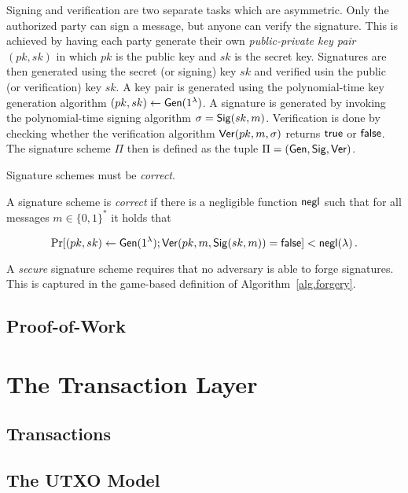 Signing and verification are two separate tasks which are asymmetric. Only the
authorized party can sign a message, but anyone can verify the signature. This
is achieved by having each party generate their own \emph{public-private
key pair} $(pk, sk)$ in which $pk$ is the public key and $sk$ is the secret key.
Signatures are then generated using the secret (or signing) key $sk$ and
verified usin the public (or verification) key $sk$. A key pair is generated
using the polynomial-time key generation algorithm $(pk, sk) \gets
\mathsf{Gen}(1^\lambda)$. A signature is generated by invoking the polynomial-time
signing algorithm $\sigma = \mathsf{Sig}(sk, m)$. Verification is done by checking
whether the verification algorithm $\mathsf{Ver}(pk, m, \sigma)$ returns $\textsf{true}$ or
$\textsf{false}$. The signature scheme $\Pi$ then is defined as the tuple
$\Pi = (\mathsf{Gen}, \mathsf{Sig}, \mathsf{Ver})$.

Signature schemes must be \emph{correct}.

\begin{definition}
  A signature scheme is \emph{correct} if there is a
  negligible function $\mathsf{negl}$ such that for all messages $m \in \{0, 1\}^*$ it
  holds that

  \[
    \Pr[(pk, sk) \gets \mathsf{Gen}(1^\lambda); \mathsf{Ver}(pk, m, \mathsf{Sig}(sk, m)) = \textsf{false}] < \mathsf{negl}(\lambda)\,.
  \]
\end{definition}

A \emph{secure} signature scheme requires that no adversary is able to forge
signatures. This is captured in the game-based definition of Algorithm~\ref{alg.forgery}.





\subsection{Proof-of-Work}

\section{The Transaction Layer}
\subsection{Transactions}
\subsection{The UTXO Model}
